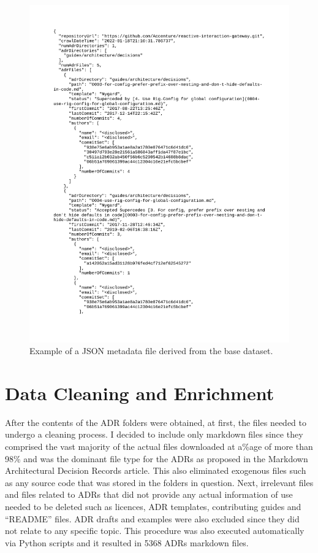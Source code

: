        \begin{figure}
            \centering
            \includegraphics[scale=0.4]{figures/JSON_data_example.png}
            \caption{Example of a JSON metadata file derived from the base dataset.}
            \label{fig:JSON_data}
        \end{figure}
        
    \section{Data Cleaning and Enrichment}
        After the contents of the ADR folders were obtained, at first, the files needed to undergo a cleaning process. I decided to include only markdown files since they comprised the vast majority of the actual files downloaded at a\%age of more than 98\% and was the dominant file type for the ADRs as proposed in the Markdown Architectural Decision Records \cite{MarkdownADRs} article. This also eliminated exogenous files such as any source code that was stored in the folders in question. Next, irrelevant files and files related to ADRs that did not provide any actual information of use needed to be deleted such as licences, ADR templates, contributing guides and ``README'' files. ADR drafts and examples were also excluded since they did not relate to any specific topic. This procedure was also executed automatically via Python scripts and it resulted in 5368 ADRs markdown files.

